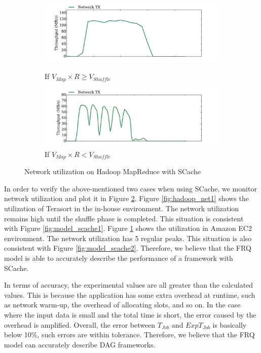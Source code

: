 {\begin{figure}
	\centering
	\begin{minipage}[hb]{\linewidth}
		\begin{subfigure}{\linewidth}
			\begin{minipage}{\linewidth}
				\includegraphics[width=\linewidth]{fig/hadoop_net1}
				\caption{\color{blue}If \(V_{Map} \times R \ge V_{Shuffle}\)}
				\label{fig:hadoop_net1}
			\end{minipage}
			\begin{minipage}{\linewidth}
				\includegraphics[width=\linewidth]{fig/hadoop_net2}
				\caption{\color{blue}If \(V_{Map} \times R < V_{Shuffle}\)}
				\label{fig:hadoop_net2}
			\end{minipage}
		\end{subfigure}
		\caption{\color{blue}Network utilization on Hadoop MapReduce with SCache}
		\label{fig:hadoop_net}
	\end{minipage}
\end{figure}

In order to verify the above-mentioned two cases when using SCache, we monitor network utilization and plot it in Figure \ref{fig:hadoop_net}. Figure \ref{fig:hadoop_net1} shows the utilization of Terasort in the in-house environment. The network utilization remains high until the shuffle phase is completed. This situation is consistent with Figure \ref{fig:model_scache1}. Figure \ref{fig:hadoop_net2} shows the utilization in Amazon EC2 environment. 
The network utilization has 5 regular peaks. This situation is also consistent with Figure \ref{fig:model_scache2}. Therefore, we believe that the FRQ model is able to accurately describe the performance of a framework with SCache.

In terms of accuracy, the experimental values are all greater than the calculated values. This is because the application has some extra overhead at runtime, such as network warm-up, the overhead of allocating slots, and so on. In the case where the input data is small and the total time is short, the error caused by the overhead is amplified. Overall, the error between \(T_{Job}\) and \(ExpT_{Job}\) is basically below 10\%, such errors are within tolerance. Therefore, we believe that the FRQ model can accurately describe DAG frameworks.
}